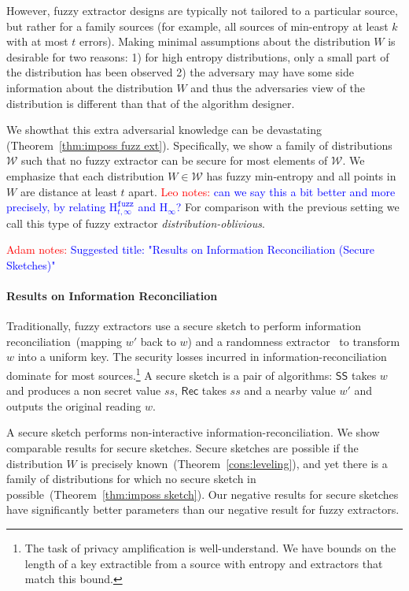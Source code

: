 \documentclass[11pt]{article}
\newcommand{\thref}[1]{\mbox{Theorem~\ref{#1}}}
\newcommand{\class}[1]{{\ensuremath{\mathsf{#1}}}}
\newcommand{\sketch}{\ensuremath{\class{SS}}\xspace}
\newcommand{\rec}{\ensuremath{\class{Rec}}\xspace}
\newcommand{\Hoo}{\mathrm{H}_\infty}
\newcommand{\Hfuzz}{\mathrm{H}^{\mathtt{fuzz}}_{t,\infty}}
\newcommand{\authnote}[2]{{\textcolor{red}{\textsf{#1 notes: }\textcolor{blue}{ #2}}\marginpar{\textcolor{red}{\textbf{!!!!!}}}}}
\newcommand{\authnote}[2]{}
\newcommand{\lnote}[1]{{\authnote{Leo}{#1}}}
\newcommand{\anote}[1]{{\authnote{Adam}{#1}}}
\begin{document}
However, fuzzy extractor designs are typically not tailored to a particular source, but rather for a family sources (for example, all sources of min-entropy at least $k$ with at most $t$ errors). Making minimal assumptions about the distribution $W$ is desirable for two reasons: 1) for high entropy distributions, only a small part of the distribution has been observed 2) the adversary may have some side information about the distribution $W$ and thus the adversaries view of the distribution is different than that of the algorithm designer.  

We showthat this extra adversarial knowledge can be devastating  (\thref{thm:imposs fuzz ext}). 
Specifically, we show a family of distributions $\mathcal{W}$ such that no fuzzy extractor can be secure for most elements of $\mathcal{W}$.  We emphasize that each distribution $W\in \mathcal{W}$ has fuzzy min-entropy and all points in $W$ are distance at least $t$ apart. \lnote{can we say this a bit better and more precisely, by relating $\Hfuzz$ and $\Hoo$?}  For comparison with the previous setting we call this type of fuzzy extractor \emph{distribution-oblivious}.


\anote{Suggested title: "Results on Information Reconciliation (Secure Sketches)"}

\paragraph{Results on Information Reconciliation}
Traditionally, fuzzy extractors use a secure sketch to perform information reconciliation~(mapping $w'$ back to $w$) and a randomness extractor~\cite{nisan1993randomness} to transform $w$ into a uniform key.  The security losses incurred in information-reconciliation dominate for most sources.\footnote{The task of privacy amplification is well-understand.  We have bounds on the length of a key extractible from a source with entropy and extractors that match this bound.}  A secure sketch is a pair of algorithms: $\sketch$ takes $w$ and produces a non secret value $ss$, $\rec$ takes $ss$ and a nearby value $w'$ and outputs the original reading $w$.  

A secure sketch performs non-interactive information-reconciliation.  We show comparable results for secure sketches.  Secure sketches are possible if the distribution $W$ is precisely known~(\thref{cons:leveling}), and yet there is a family of distributions for which no secure sketch in possible~(\thref{thm:imposs sketch}). Our negative results for secure sketches have significantly better parameters than our negative result for fuzzy extractors.  
\end{document}
